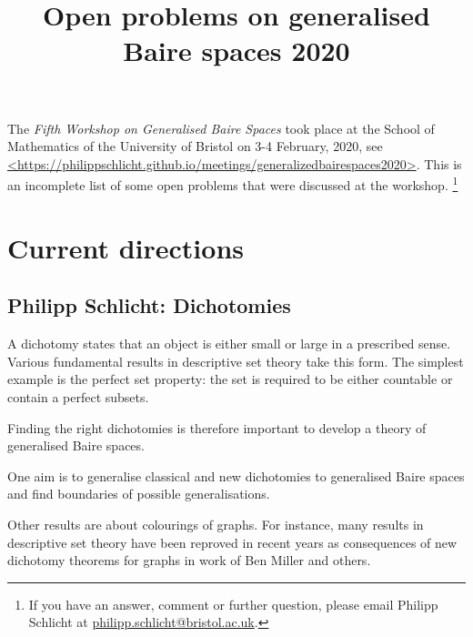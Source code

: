 \documentclass{amsart}
\title{Open problems on generalised Baire spaces 2020}
\theoremstyle{definition}
\begin{document}
\maketitle

The \emph{Fifth Workshop on Generalised Baire Spaces} took place at the School of Mathematics of the University of Bristol on 3-4 February, 2020, see \url{<https://philippschlicht.github.io/meetings/generalizedbairespaces2020>}. 
This is an incomplete list of some open problems that were discussed at the workshop. 
\footnote{%
If you have an answer, comment or further question, please email Philipp Schlicht at \href{mailto:philipp.schlicht@bristol.ac.uk} {philipp.schlicht@bristol.ac.uk}.} 






\iffalse 
\section{Current directions} 


\subsection{Philipp Schlicht: Dichotomies} 


A dichotomy states that an object is either small or large in a prescribed sense. 
Various fundamental results in descriptive set theory take this form. 
The simplest example is the perfect set property: the set is required to be either countable or contain a perfect subsets. 

Finding the right dichotomies is therefore important to develop a theory of generalised Baire spaces. 

One aim is to generalise classical and new dichotomies to generalised Baire spaces and find boundaries of possible generalisations. 

Other results are about colourings of graphs. 
For instance, many results in descriptive set theory have been reproved in recent years as consequences of new dichotomy theorems for graphs in work of Ben Miller and others. 
\end{document}

